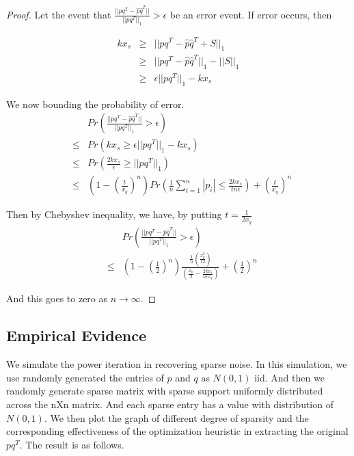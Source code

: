\documentclass{../common/projectreport}
\begin{document}
\begin{proof}
Let the event that $\frac{||pq^{T}-\hat{p}\hat{q}^{T}||}{||pq^{T}||_{1}}>\epsilon$
be an error event. If error occurs, then 

\begin{eqnarray*}
kx_{s} & \ge & ||pq^{T}-\hat{p}\hat{q}^{T}+S||_{1}\\
 & \ge & ||pq^{T}-\hat{p}\hat{q}^{T}||_{1}-||S||_{1}\\
 & \ge & \epsilon||pq^{T}||_{1}-kx_{s}
\end{eqnarray*}


We now bounding the probability of error. 
\begin{eqnarray*}
 &  & Pr(\frac{||pq^{T}-\hat{p}\hat{q}^{T}||}{||pq^{T}||_{1}}>\epsilon)\\
 & \le & Pr(kx_{s}\ge\epsilon||pq^{T}||_{1}-kx_{s})\\
 & \le & Pr(\frac{2kx_{s}}{\epsilon}\ge||pq^{T}||_{1})\\
 & \le & (1-(\frac{t}{x_{q}})^{n})Pr(\frac{1}{n}\sum_{i=1}^{n}|p_{i}|\le\frac{2kx_{s}}{tn\epsilon})+(\frac{t}{x_{q}})^{n}
\end{eqnarray*}


Then by Chebyshev inequality, we have, by putting $t=\frac{1}{2x_{q}}$
\begin{eqnarray*}
 &  & Pr(\frac{||pq^{T}-\hat{p}\hat{q}^{T}||}{||pq^{T}||_{1}}>\epsilon)\\
 & \le & (1-(\frac{1}{2})^{n})\frac{\frac{1}{n}(\frac{x_{p}^{2}}{12})}{(\frac{x_{p}}{2}-\frac{2kx_{s}}{n\epsilon x_{q}})}+(\frac{1}{2})^{n}
\end{eqnarray*}


And this goes to zero as $n\to\infty$.
\end{proof}



\subsection{Empirical Evidence}

We simulate the power iteration in recovering sparse noise. In this simulation, we use randomly generated the entries of $p$ and $q$ as $N(0,1)$ iid. And then we randomly generate sparse matrix with sparse support uniformly distributed across the nXn matrix. And each sparse entry has a value with distribution of $N(0,1)$. We then plot the graph of different degree of sparsity and the corresponding effectiveness of the optimization heuristic in extracting the original $pq^{T}$.
The result is as follows.
\end{document}
